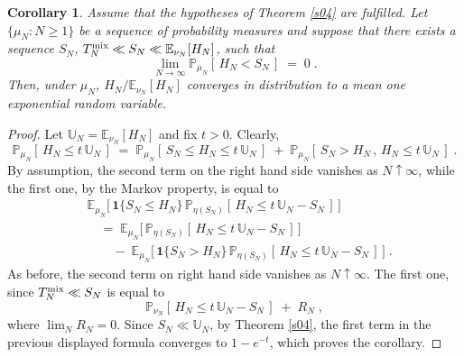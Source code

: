 \documentclass[reqno]{amsart}
\newtheorem{corollary}[theorem]{Corollary}
\begin{document}
\begin{corollary}
\label{s13}
Assume that the hypotheses of Theorem \ref{s04} are fulfilled. Let
$\{\mu_N : N\ge 1\}$ be a sequence of probability measures and suppose
that there exists a sequence $S_N$, $T^{\rm mix}_N \ll S_N \ll {{\mathbb E}}_{\nu_N} [H_N]$, such that
\begin{equation}
\label{19}
\lim_{N\to\infty} {{\mathbb P}}_{\mu_N} [\, H_N < S_N \,] \;=\; 0\;.
\end{equation}
Then, under $\mu_N$, $H_N/ {{\mathbb E}}_{\nu_N} [H_N]$ converges in
distribution to a mean one exponential random variable.
\end{corollary}

\begin{proof}
Let ${{\mathbb U}}_N = {{\mathbb E}}_{\nu_N} [H_N]$ and fix  $t>0$. Clearly,
\begin{equation*}
{{\mathbb P}}_{\mu_N} [\, H_N \le t \, {{\mathbb U}}_N \,] \;=\; {{\mathbb P}}_{\mu_N} [\, S_N \le
H_N \le t \, {{\mathbb U}}_N \,] \;+\; {{\mathbb P}}_{\mu_N} [\, S_N > H_N \,,\, 
H_N \le t \, {{\mathbb U}}_N \,]\;.
\end{equation*}
By assumption, the second term on the right hand side vanishes as
$N\uparrow\infty$, while the first one, by the Markov property, is
equal to
\begin{equation*}
\begin{split}
& {{\mathbb E}}_{\mu_N} \big[\, {{\mathbf 1}}\{S_N \le H_N\}\, 
{{\mathbb P}}_{\eta(S_N)}  [\, H_N \le t \, {{\mathbb U}}_N - S_N \,] \,\big] \\
&\quad =\; {{\mathbb E}}_{\mu_N} \big[\, 
{{\mathbb P}}_{\eta(S_N)}  [\, H_N \le t \, {{\mathbb U}}_N - S_N \,] \,\big] \\
&\qquad -\; {{\mathbb E}}_{\mu_N} \big[\, {{\mathbf 1}}\{S_N > H_N\}\, 
{{\mathbb P}}_{\eta(S_N)}  [\, H_N \le t \, {{\mathbb U}}_N - S_N \,] \,\big]
\;.   
\end{split}
\end{equation*}
As before, the second term on right hand side vanishes as
$N\uparrow\infty$. The first one, since $T^{\rm mix}_N \ll S_N$ is
equal to 
\begin{equation*}
{{\mathbb P}}_{\nu_N}  [\, H_N \le t \, {{\mathbb U}}_N - S_N \,] \;+\; R_N\;,
\end{equation*}
where $\lim_N R_N =0$. Since $S_N\ll {{\mathbb U}}_N$, by Theorem \ref{s04},
the first term in the previous displayed formula converges to
$1-e^{-t}$, which proves the corollary.
\end{proof}
\end{document}
